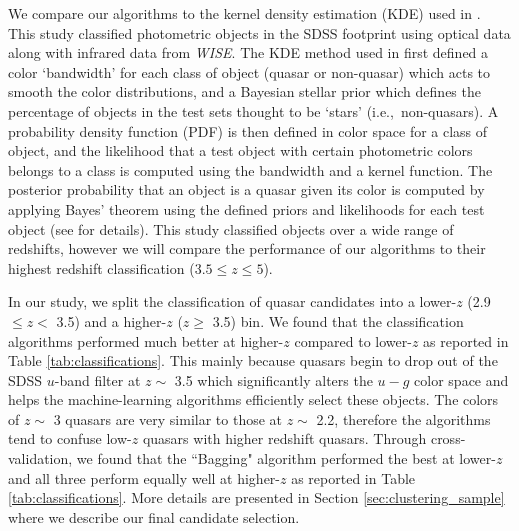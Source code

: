\documentclass[apj, numberedappendix]{emulateapj}
\begin{document}
We compare our algorithms to the kernel density estimation (KDE) used in \citet{Richards2015}. This study classified photometric objects in the SDSS footprint using optical data along with infrared data from \emph{WISE}. The KDE method used in \citet{Richards2015} first defined a color `bandwidth' for each class of object (quasar or non-quasar) which acts to smooth the color distributions, and a Bayesian stellar prior which defines the percentage of objects in the test sets thought to be `stars' (i.e.,\ non-quasars). A probability density function (PDF) is then defined in color space for a class of object, and the likelihood that a test object with certain photometric colors belongs to a class is computed using the bandwidth and a kernel function. The posterior probability that an object is a quasar given its color is computed by applying Bayes' theorem using the defined priors and likelihoods for each test object (see \citealt{Richards2009} for details). This study classified objects over a wide range of redshifts, however we will compare the performance of our algorithms to their highest redshift classification ($3.5 \leq z \leq 5$). 

In our study, we split the classification of quasar candidates into a lower-$z$ (2.9$\leq z <$ 3.5) and a higher-$z$ ($z \geq$ 3.5) bin. We found that the classification algorithms performed much better at higher-$z$ compared to lower-$z$ as reported in Table \ref{tab:classifications}. This mainly because quasars begin to drop out of the SDSS $u$-band filter at $z \sim$ 3.5 which significantly alters the $u-g$ color space and helps the machine-learning algorithms efficiently select these objects. The colors of $z \sim$ 3 quasars are very similar to those at $z \sim$ 2.2, therefore the algorithms tend to confuse low-$z$ quasars with higher redshift quasars. Through cross-validation, we found that the ``Bagging" algorithm performed the best at lower-$z$ and all three perform equally well at higher-$z$ as reported in Table \ref{tab:classifications}. More details are presented in Section \ref{sec:clustering_sample} where we describe our final candidate selection.

\end{document}

